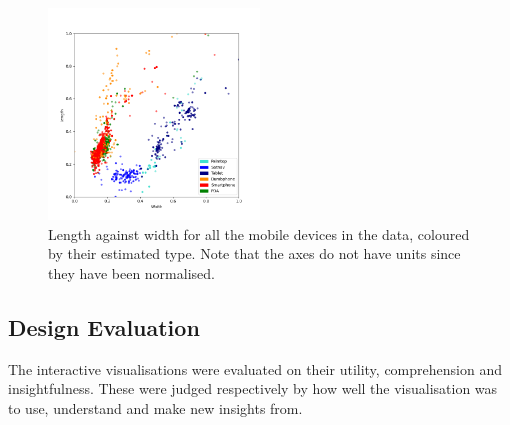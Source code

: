 \documentclass[conference]{IEEEtran}
\begin{document}
\begin{figure}
    \centering
    \includegraphics[width=0.5\textwidth]{../Visualisations/A/length-width-ctype.png}
    \caption{Length against width for all the mobile devices in the data,
	coloured by their estimated type. Note that the axes do not have units
	since they have been normalised.}
    \label{fig:HeightvsWidth}
\end{figure}


\subsection{Design Evaluation}


The interactive visualisations were evaluated on their utility, comprehension
and insightfulness. These were judged respectively by how well the visualisation
was to use, understand and make new insights from.
\end{document}

